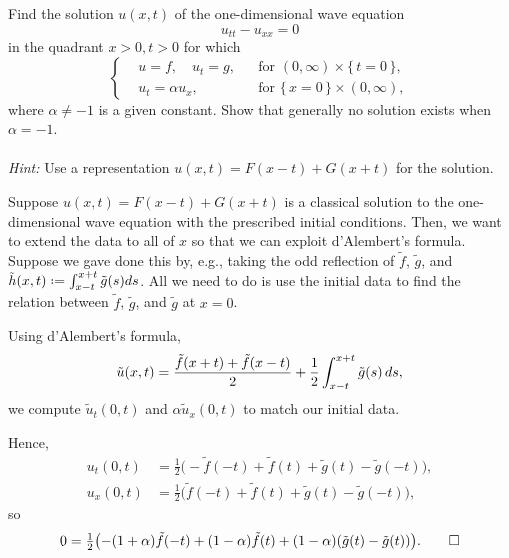 \begin{problem}
  Find the solution \(u(x,t)\) of the one-dimensional wave equation
  \[
    u_{tt}-u_{xx}=0
  \]
  in the quadrant \(x>0,t>0\) for which
  \[
    \left\{
      \begin{aligned}
        &u=f,\quad u_t=g,%
        &&\text{for \((0,\infty)\times\{\,t=0\,\}\),}\\
        &u_t=\alpha u_x,%
        &&\text{for \(\{\,x=0\,\}\times(0,\infty)\)},
      \end{aligned}
    \right.
  \]
  where \(\alpha\neq -1\) is a given constant. Show that generally no
  solution exists when \(\alpha=-1\).
  \\\\
  \emph{Hint:} Use a representation \(u(x,t)=F(x-t)+G(x+t)\) for the
  solution.
\end{problem}
\begin{solution*}
  Suppose \(u(x,t)=F(x-t)+G(x+t)\) is a classical solution to the
  one-dimensional wave equation with the prescribed initial
  conditions. Then, we want to extend the data to all of \(x\) so that we
  can exploit d'Alembert's formula. Suppose we gave done this by, e.g.,
  taking the odd reflection of \(\tilde f\), \(\tilde g\), and
  \(\tilde h(x,t)\defeq \int_{x-t}^{x+t} \tilde g(s)ds\). All we need to do
  is use the initial data to find the relation between \(\tilde f\),
  \(\tilde g\), and \(\tilde g\) at \(x=0\).

  Using d'Alembert's formula,
  \[
    \tilde u(x,t) =\frac{\tilde f(x+t)+\tilde
      f(x-t)}{2}+\frac{1}{2}\int_{x-t}^{x+t}\tilde g(s)\mathop{}\!d s,
  \]
  we compute \(\tilde u_t(0,t)\) and \(\alpha\tilde u_x(0,t)\) to match
  our initial data.

  Hence,
  \begin{align*}
    u_t(0,t)&=\tfrac{1}{2}
              \bigl(-\tilde f(-t)+\tilde f(t)+\tilde g(t)-\tilde g(-t)\bigr),\\
    u_x(0,t)&=\tfrac{1}{2}
              \bigl(\tilde f(-t)+\tilde f(t)+\tilde g(t)-\tilde g(-t)\bigr),
  \end{align*}
  so
  \[
    0=\tfrac{1}{2}\bigl(-(1+\alpha)\tilde f(-t)+(1-\alpha)\tilde
    f(t)+(1-\alpha)(\tilde g(t)-\tilde g(t))\bigr).\qedhere
  \]
\end{solution*}

